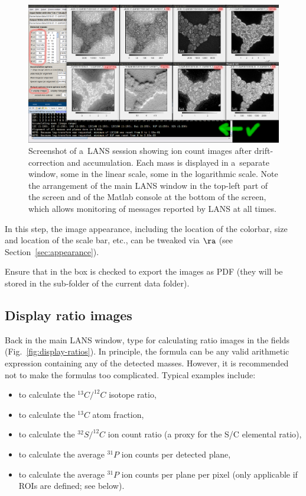 \begin{figure}[!ht]
\centering
\includegraphics[width=\textwidth]{figs3/LANS-display-masses}
\caption{\label{fig:display-masses}%
Screenshot of a~LANS session showing ion count images after drift-correction and accumulation. Each mass is displayed in a~separate window, some in the linear scale, some in the logarithmic scale. Note the arrangement of the main LANS window in the top-left part of the screen and of the Matlab console at the bottom of the screen, which allows monitoring of messages reported by LANS at all times.}
\end{figure}

\bul In this step, the image appearance, including the location of the colorbar, size and location of the scale bar, etc., can be tweaked via  $\ra$  (see Section~\ref{sec:appearance}). 

\bul Ensure that  in the  box is checked to export the images as PDF (they will be stored in the  sub-folder of the current data folder).


\subsection{Display ratio images}
\setcounter{step}{0}

\s Back in the main LANS window, type  for calculating ratio images in the   fields (Fig.~\ref{fig:display-ratios}). In principle, the formula can be any valid arithmetic expression containing any of the detected masses. However, it is recommended not to make the formulas too complicated. Typical examples include:

\begin{itemize}
\item {} to calculate the $^{13}C/^{12}C$ isotope ratio,
\item {} to calculate the $^{13}C$ atom fraction,
\item {} to calculate the $^{32}S/^{12}C$ ion count ratio (a proxy for the S/C elemental ratio), 
\item {} to calculate the average $^{31}P$ ion counts per detected plane, 
\item {} to calculate the average $^{31}P$ ion counts per plane per pixel (only applicable if ROIs are defined; see below).
\end{itemize}

